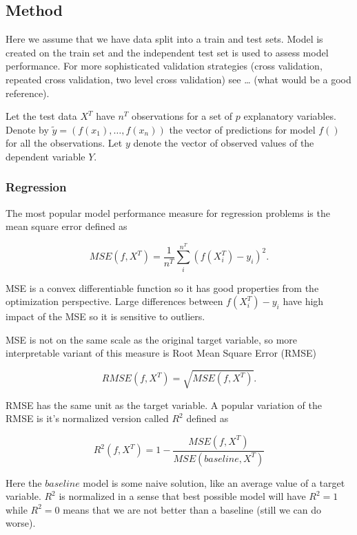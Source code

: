 \documentclass[12pt,]{krantz}
\begin{document}
\hypertarget{modelPerformanceMethod}{%
\subsection{Method}\label{modelPerformanceMethod}}

Here we assume that we have data split into a train and test sets. Model is created on the train set and the independent test set is used to assess model performance. For more sophisticated validation strategies (cross validation, repeated cross validation, two level cross validation) see \ldots{} (what would be a good reference).

Let the test data \(X^T\) have \(n^T\) observations for a set of \(p\) explanatory variables. Denote by \(\widetilde{y}=(f(x_1),\ldots,f(x_n))\) the vector of predictions for model \(f()\) for all the observations. Let \(y\) denote the vector of observed values of the dependent variable \(Y\).

\hypertarget{regression}{%
\subsubsection{Regression}\label{regression}}

The most popular model performance measure for regression problems is the mean square error defined as

\[
MSE(f, X^T) = \frac{1}{n^T} \sum_{i}^{n^T} (f(X^T_i) - y_i)^2.
\]

MSE is a convex differentiable function so it has good properties from the optimization perspective.
Large differences between \(f(X^T_i) - y_i\) have high impact of the MSE so it is sensitive to outliers.

MSE is not on the same scale as the original target variable, so more interpretable variant of this measure is Root Mean Square Error (RMSE)

\[
RMSE(f, X^T) = \sqrt{MSE(f, X^T)}.
\]

RMSE has the same unit as the target variable. A popular variation of the RMSE is it's normalized version called \(R^2\) defined as

\[
R^2(f, X^T) = 1 - \frac{MSE(f, X^T)}{MSE(baseline, X^T)}
\]

Here the \(baseline\) model is some naive solution, like an average value of a target variable. \(R^2\) is normalized in a sense that best possible model will have \(R^2 = 1\) while \(R^2 = 0\) means that we are not better than a baseline (still we can do worse).
\end{document}
